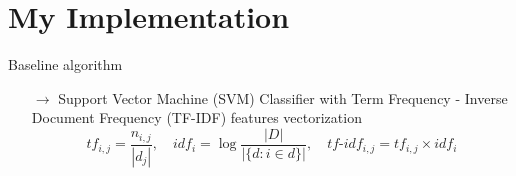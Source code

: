 \documentclass{beamer}
\begin{document}
%		
%				








	







	\section{My Implementation}

	\begin{frame}{Baseline algorithm}
		
		\begin{itemize}
			\item[$\rightarrow$] Support Vector Machine (SVM) Classifier with Term Frequency - Inverse Document Frequency (TF-IDF) features vectorization
			\[tf_{i,j}=\frac{n_{i,j}}{|d_j|}, \quad idf_i=\log \frac{|D|}{|\{d:i\in d\}|}, \quad tf\text{-}idf_{i,j}=tf_{i,j} \times idf_i\]
		\end{itemize}
		
 	\end{frame}
 	
\end{document}
